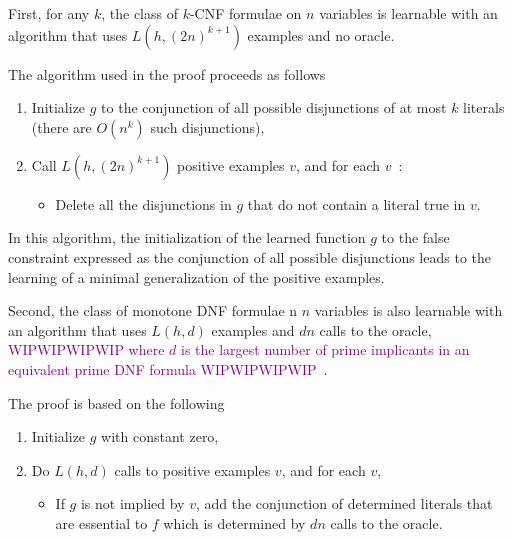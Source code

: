 \documentclass{llncs}
\newcommand{\wip}[1]{\textcolor{Purple}{WIPWIPWIPWIP #1 WIPWIPWIPWIP}}
\begin{document}
\begin{theorem}\label{thm:kcnf}
First, for any $k$, the class of $k$-CNF formulae on $n$ variables is learnable with an
algorithm that uses $L(h,{(2 n)}^{k+1})$ examples and no oracle.
\end{theorem}

The algorithm used in the proof proceeds as follows

\begin{algorithm}\label{algCNF}
\begin{enumerate}
  \item Initialize $g$ to the conjunction of all possible disjunctions of at most $k$ literals (there are $O(n^k)$ such disjunctions),
\item Call $L(h,(2n)^{k+1})$ positive examples $v$, and for each $v$~:
\begin{itemize}
\item Delete all the disjunctions in $g$ that do not contain a literal true in $v$.	
\end{itemize}

\end{enumerate}
\end{algorithm}

In this algorithm, the initialization of the learned function $g$ to the false constraint expressed as the conjunction of all possible disjunctions
leads to the learning of a minimal  generalization of the positive examples.


\begin{theorem}\label{thm:mdnf}
    Second, the class of monotone DNF formulae n $n$ variables is also learnable with an
    algorithm that uses $L(h,d)$ examples and $d n$ calls to the oracle,
    \wip{where $d$ is the largest number of prime implicants in an equivalent prime DNF formula}~\cite{Valiant84cacm}.
\end{theorem}

The proof is based on the following

\begin{algorithm}\label{algDNF}
\begin{enumerate}
\item Initialize $g$ with constant zero,
\item
Do $L(h,d)$ calls to positive examples $v$, and for each $v$,
\begin{itemize}
	\item 
	If $g$ is not implied by $v$, add the conjunction of determined literals that
	are essential to $f$ which is determined by $d n$ calls to the oracle.
\end{itemize}
\end{enumerate}
\end{algorithm}
\end{document}
